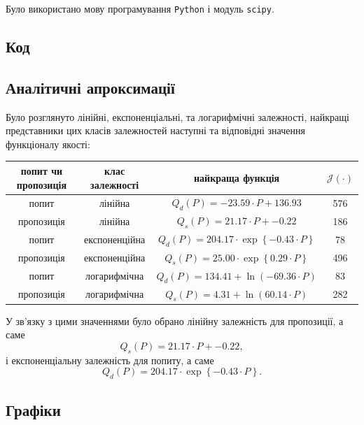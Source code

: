 Було використано мову програмування \texttt{Python} і модуль \texttt{scipy}.

\subsection{Код}


\subsection{Аналітичні апроксимації}

Було розглянуто лінійні, експоненціальні, та логарифмічні залежності, найкращі представники цих класів залежностей наступні та відповідні значення функціоналу якості:
\begin{table}[H]
	\centering
	\begin{tabular}{|c|c|c|c|} \hline
		попит чи пропозиція & клас залежності & найкраща функція & $\mathcal{J}(\cdot)$ \\ \hline
		попит & лінійна & $Q_d(P) = -23.59 \cdot P + 136.93$ & 576 \\ \hline
        пропозиція & лінійна & $Q_s(P) = 21.17 \cdot P + -0.22$ & 186 \\ \hline
        попит & експоненційна & $Q_d(P) = 204.17 \cdot \exp\left\{-0.43 \cdot P\right\}$ & 78 \\ \hline
        пропозиція & експоненційна & $Q_s(P) = 25.00 \cdot \exp\left\{0.29 \cdot P\right\}$& 496 \\ \hline
        попит & логарифмічна & $Q_d(P) = 134.41 + \ln(-69.36 \cdot P)$ & 83 \\ \hline
        пропозиція & логарифмічна & $Q_s(P) = 4.31 + \ln(60.14 \cdot P)$ & 282 \\ \hline
    \end{tabular}
\end{table}

У зв'язку з цими значеннями було обрано лінійну залежність для пропозиції, а саме \[ Q_s(P) = 21.17 \cdot P + -0.22, \] і експоненціальну залежність для попиту, а саме \[ Q_d(P) = 204.17 \cdot \exp\left\{-0.43 \cdot P\right\}. \]

\subsection{Графіки}

